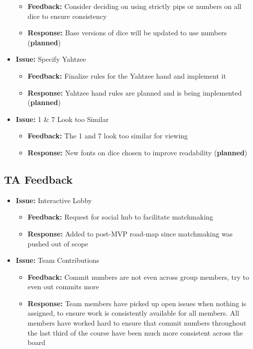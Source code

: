 \documentclass{article}
\begin{document}
\begin{itemize}
\begin{itemize}
        \item \textbf{Feedback:} Consider deciding on using strictly pips or numbers on all dice to ensure consistency
        \item \textbf{Response:} Base versions of dice will be updated to use numbers (\textbf{planned})
    \end{itemize}
    \item \textbf{Issue:} Specify Yahtzee
    \begin{itemize}
        \item \textbf{Feedback:} Finalize rules for the Yahtzee hand and implement it
        \item \textbf{Response:} Yahtzee hand rules are planned and is being implemented (\textbf{planned})
    \end{itemize}
    \item \textbf{Issue:} 1 \& 7 Look too Similar
    \begin{itemize}
        \item \textbf{Feedback:} The 1 and 7 look too similar for viewing
        \item \textbf{Response:} New fonts on dice chosen to improve readability (\textbf{planned})
    \end{itemize}
\end{itemize}

\subsection{TA Feedback}

\begin{itemize}
    \item \textbf{Issue:} Interactive Lobby
    \begin{itemize}
        \item \textbf{Feedback:} Request for social hub to facilitate matchmaking
        \item \textbf{Response:} Added to post-MVP road-map since matchmaking was pushed out of scope
    \end{itemize}

    \item \textbf{Issue:} Team Contributions
    \begin{itemize}
        \item \textbf{Feedback:} Commit numbers are not even across group members, try to even out commits more
        \item \textbf{Response:} Team members have picked up open issues when nothing is assigned, to ensure work is consistently available for all members. All members have worked hard to ensure that commit numbers throughout the last third of the course have been much more consistent across the board
    \end{itemize}
\end{itemize}
\end{document}
